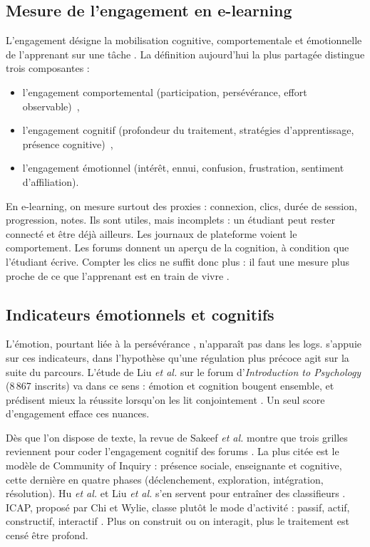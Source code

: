 \subsection{Mesure de l'engagement en e-learning}

L'engagement désigne la mobilisation cognitive, comportementale et
émotionnelle de l'apprenant sur une tâche \cite{fredricks2004school}. La
définition aujourd'hui la plus partagée distingue trois composantes :
\begin{itemize}
  \item l'engagement comportemental (participation, persévérance,
  effort observable)~,
  \item l'engagement cognitif (profondeur du traitement, stratégies
  d'apprentissage, présence cognitive)~,
  \item l'engagement émotionnel (intérêt, ennui, confusion,
  frustration, sentiment d'affiliation).
\end{itemize}
En e-learning, on mesure surtout des proxies : connexion, clics,
durée de session, progression, notes. Ils sont utiles, mais incomplets :
un étudiant peut rester connecté et être déjà ailleurs. Les journaux de
plateforme voient le comportement. Les forums donnent un aperçu de la
cognition, à condition que l'étudiant écrive. Compter les clics ne
suffit donc plus : il faut une mesure plus proche de ce que l'apprenant
est en train de vivre
\cite{kizilcec2013deconstructing,dmello2015review}.

\subsection{Indicateurs émotionnels et cognitifs}

L'émotion, pourtant liée à la persévérance
\cite{pekrun2006control,dmello2012dynamics}, n'apparaît pas dans les logs.
\emolearn{} s'appuie sur ces indicateurs, dans l'hypothèse qu'une
régulation plus précoce agit sur la suite du parcours. L'étude de Liu \emph{et al.} sur le forum d'\emph{Introduction
to Psychology} (8\,867 inscrits) va dans ce sens : émotion et cognition
bougent ensemble, et prédisent mieux la réussite lorsqu'on les lit
conjointement \cite{liu2022automated}. Un seul score d'\og engagement \fg{}
efface ces nuances.

Dès que l'on dispose de texte, la revue de Sakeef \emph{et al.} montre que
trois grilles reviennent pour coder l'engagement cognitif des
forums \cite{sakeef2025detecting}. La plus citée est le modèle de
Community of Inquiry \cite{garrison1999critical} : présence sociale,
enseignante et cognitive, cette dernière en quatre phases (déclenchement,
exploration, intégration, résolution). Hu \emph{et al.} et Liu \emph{et al.}
s'en servent pour entraîner des classifieurs
\cite{hu2021automatic,liu2023moocbert}. ICAP, proposé par Chi et Wylie,
classe plutôt le mode d'activité : passif, actif, constructif,
interactif \cite{chi2014icap}. Plus on construit ou on interagit, plus le
traitement est censé être profond.

